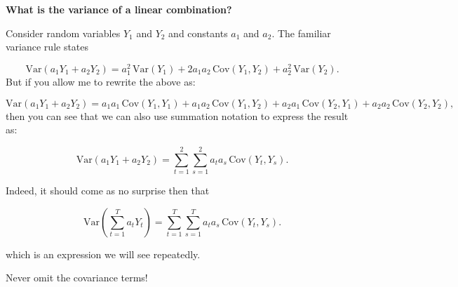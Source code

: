 \documentclass[
  letterpaper,
  DIV=11,
  numbers=noendperiod]{scrartcl}
\newcommand{\slidelabel}[1]{{\color{embernavy}\bfseries\large #1\par\vspace{5pt}}}
\newenvironment{slidefooter}{%
  \par\vspace{7pt}{\color{emberrule}\rule{\linewidth}{0.4pt}}\par\vspace{4pt}%
  \color{emberamber}\itshape\small}{\par}
\begin{document}
\begin{slidebox}

\slidelabel{What is the variance of a linear combination?}

Consider random variables \(Y_1\) and \(Y_2\) and constants \(a_1\) and
\(a_2\). The familiar variance rule states

\[\text{Var}(a_1 Y_1 + a_2 Y_2) = a_1^2\,\text{Var}(Y_1) + 2a_1 a_2\,\text{Cov}(Y_1, Y_2) + a_2^2\,\text{Var}(Y_2).\]
But if you allow me to rewrite the above as:

\[\text{Var}(a_1 Y_1 + a_2 Y_2) = a_1 a_1 \,\text{Cov}(Y_1,Y_1) + a_1 a_2\,\text{Cov}(Y_1, Y_2) + a_2 a_1\,\text{Cov}(Y_2, Y_1) +  a_2a_2\,\text{Cov}(Y_2,Y_2),\]
then you can see that we can also use summation notation to express the
result as:

\[\text{Var}(a_1 Y_1 + a_2 Y_2) = \sum_{t=1}^{2}\sum_{s=1}^{2} a_t a_s\,\text{Cov}(Y_t, Y_s).\]

Indeed, it should come as no surprise then that

\[\text{Var}\!\left(\sum_{t=1}^{T} a_t Y_t\right) = \sum_{t=1}^{T}\sum_{s=1}^{T} a_t a_s\,\text{Cov}(Y_t, Y_s).\]

which is an expression we will see repeatedly.

\begin{slidefooter}

Never omit the covariance terms!

\end{slidefooter}

\end{slidebox}
\end{document}
